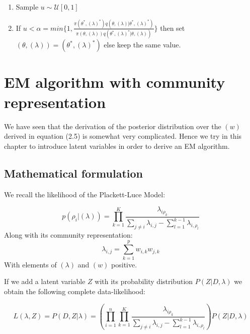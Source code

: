 \documentclass[12pt]{ociamthesis}  %
\begin{document}
\begin{enumerate}
\begin{enumerate}
	\item Sample $u \sim \mathcal{U}[0,1]$
	
	\item If $u < \alpha = min\{ 1, \frac{\pi(\theta^{*}, (\lambda)^{*})q(\theta, (\lambda) |\theta^{*}, (\lambda)^{*})}{\pi(\theta, (\lambda))q(\theta^{*}, (\lambda)^{*} |\theta, (\lambda))}   \}$ then set $(\theta, (\lambda)) = (\theta^{*}, (\lambda)^{*})$ else keep the same value.
	
	
	
	\end{enumerate}
	
	\end{enumerate}
	
	\chapter{EM algorithm with community representation}
	
	We have seen that the derivation of the posterior distribution over the $(w)$ derived in equation (2.5) is somewhat very complicated. Hence we try in this chapter to introduce latent variables in order to derive an EM algorithm.
	
	\section{Mathematical formulation}
	
	We recall the likelihood of the Plackett-Luce Model:
	
	\begingroup
	\large
	\begin{equation}
	p(\rho_{i} | (\lambda)) = \prod_{k = 1}^{K}\frac{\lambda_{i\rho_{k}}}{\sum_{j \neq i}\lambda_{i,j} - \sum_{l = 1}^{k - 1}\lambda_{i,\rho_{l}}}
	\end{equation}
	\endgroup
	Along with its community representation:
	\begingroup
	\large
	\begin{equation}
	\lambda_{i,j} = \sum_{k = 1}^{p} w_{i,k} w_{j,k}
	\end{equation}
	\endgroup
	With elements of $(\lambda)$ and $(w)$ positive.
	
	If we add a latent variable $Z$ with its probability distribution $P(Z | D, \lambda)$ we obtain the following complete data-likelihood:
	
	\begingroup
	\large
	\begin{equation}
	L(\lambda,Z) = P(D,Z | \lambda) = (\prod_{i = 1}^{n}\prod_{k = 1}^{K}\frac{\lambda_{i\rho_{k}}}{\sum_{j \neq i}\lambda_{i,j} - \sum_{l = 1}^{k - 1}\lambda_{i,\rho_{l}}})P(Z | D, \lambda)
	\end{equation}
	\endgroup
	
\end{document}
